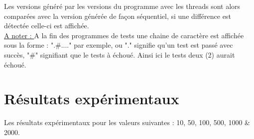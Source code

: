 \documentclass[10pt,a4paper]{article}
\begin{document}
Les versions généré par les versions du programme avec les threads sont alors comparées avec la version générée de façon séquentiel, si une différence est détectée celle-ci est affichée. \\	

\underline{A noter : } A la fin des programmes de tests une chaine de caractère est affichée sous la forme : ".\#...." par exemple, ou "." signifie qu'un test est passé avec succès, "\#" signifiant que le tests à échoué. Ainsi ici le tests deux (2) aurait échoué.

\section{Résultats expérimentaux}

Les résultats expérimentaux pour les valeurs suivantes : 10, 50, 100, 500, 1000 \& 2000. \\
\end{document}

